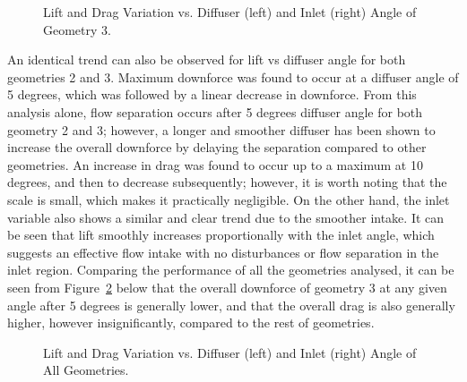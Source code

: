 \begin{figure}[!h]
    \noindent{}
    \caption{Lift and Drag Variation vs. Diffuser (left) and Inlet (right) Angle of Geometry 3.}
    \label{fig:2D_OF_A4_results}
\end{figure}

\noindent An identical trend can also be observed for lift vs diffuser angle for both geometries 2 and 3. Maximum downforce was found to occur at a diffuser angle of 5 degrees, which was followed by a linear decrease in downforce. From this analysis alone, flow separation occurs after 5 degrees diffuser angle for both geometry 2 and 3; however, a longer and smoother diffuser has been shown to increase the overall downforce by delaying the separation compared to other geometries. An increase in drag was found to occur up to a maximum at 10 degrees, and then to decrease subsequently; however, it is worth noting that the scale is small, which makes it practically negligible. On the other hand, the inlet variable also shows a similar and clear trend due to the smoother intake. It can be seen that lift smoothly increases proportionally with the inlet angle, which suggests an effective flow intake with no disturbances or flow separation in the inlet region. Comparing the performance of all the geometries analysed, it can be seen from Figure~\ref{fig:2D_OF_PLOT_COMPARE_ALL} below that the overall downforce of geometry 3 at any given angle after 5 degrees is generally lower, and that the overall drag is also generally higher, however insignificantly, compared to the rest of geometries.

\begin{figure}[h!]
    \noindent{}
    \caption{Lift and Drag Variation vs. Diffuser (left) and Inlet (right) Angle of All Geometries.}
    \label{fig:2D_OF_PLOT_COMPARE_ALL}
\end{figure}

